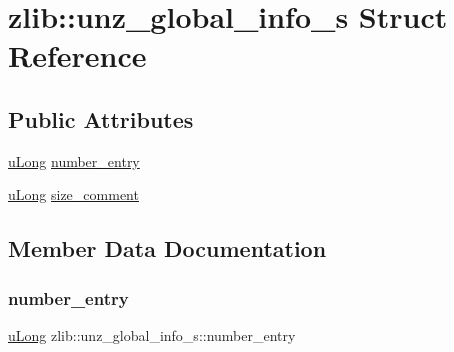 \hypertarget{structzlib_1_1unz__global__info__s}{}\section{zlib\+:\+:unz\+\_\+global\+\_\+info\+\_\+s Struct Reference}
\label{structzlib_1_1unz__global__info__s}
\subsection*{Public Attributes}
\begin{DoxyCompactItemize}
\item 
\hyperlink{namespacezlib_a3bc0123d9337acd75d286df79e6cf7da}{u\+Long} \hyperlink{structzlib_1_1unz__global__info__s_a66d0605a81b27219c33a84097b8d163f}{number\+\_\+entry}
\item 
\hyperlink{namespacezlib_a3bc0123d9337acd75d286df79e6cf7da}{u\+Long} \hyperlink{structzlib_1_1unz__global__info__s_a663fe2a8dd231d767a356ad3a1877112}{size\+\_\+comment}
\end{DoxyCompactItemize}


\subsection{Member Data Documentation}
\mbox{\label{structzlib_1_1unz__global__info__s_a66d0605a81b27219c33a84097b8d163f}} 
\subsubsection{\texorpdfstring{number\+\_\+entry}{number\_entry}}
{\footnotesize\ttfamily \hyperlink{namespacezlib_a3bc0123d9337acd75d286df79e6cf7da}{u\+Long} zlib\+::unz\+\_\+global\+\_\+info\+\_\+s\+::number\+\_\+entry}

\mbox{\label{structzlib_1_1unz__global__info__s_a663fe2a8dd231d767a356ad3a1877112}} 
